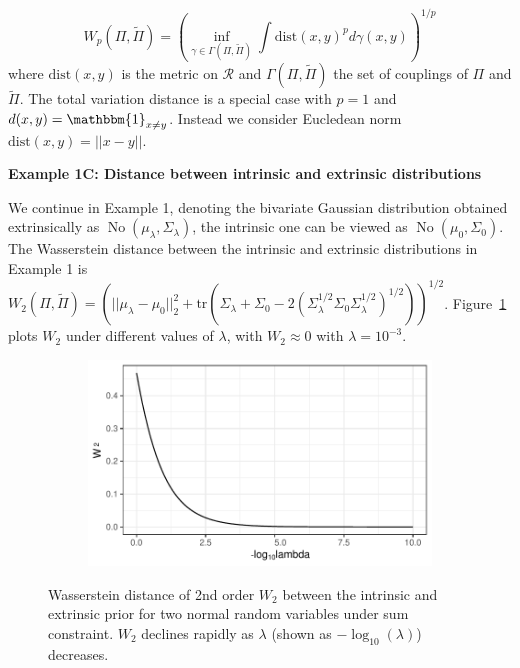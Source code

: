 \documentclass[10pt]{article}
\newcommand{\mc}[1]{\mathcal{#1}}
\DeclareMathOperator{\No}{No}
\DeclareMathOperator{\1}{\mathbbm{1}}
\begin{document}
$$W_p(\Pi,\tilde\Pi)=\left(\underset{\gamma\in \Gamma(\Pi,\tilde\Pi)}{\inf}\int \text{dist}(x,y)^p d\gamma(x,y)\right)^{1/p}$$
 where $ \text{dist}(x,y)$ is the metric on $\mc R$ and $\Gamma(\Pi,\tilde\Pi)$ the set of couplings of $\Pi$ and $\tilde\Pi$. The total variation distance is a special case with $p=1$ and $d(x,y)= \mathbbm{1}_{x \neq y}$. Instead we consider Eucledean norm $\text{dist}(x,y)=||x-y||$.


{\bf Example 1C: Distance between intrinsic and extrinsic distributions} 

We continue in Example 1, denoting the bivariate Gaussian distribution obtained extrinsically as $\No(\mu_\lambda, \Sigma_\lambda)$, the intrinsic one can be viewed as $\No(\mu_0, \Sigma_0)$. The Wasserstein distance between the intrinsic and extrinsic distributions in Example 1 \citep{dowson1982frechet} is $W_2 (\Pi,\tilde\Pi)= \left( ||\mu_\lambda - \mu_0||_2^2+ \text{tr}(\Sigma_\lambda+\Sigma_0- 2 (\Sigma_\lambda^{1/2}  \Sigma_0 \Sigma_\lambda^{1/2})^{1/2}) \right)^{1/2} $. Figure~\ref{two_normal_wass} plots $W_2$ under different values of $\lambda$, with $W_2\approx 0$ with $\lambda=10^{-3}$.



\begin{figure}[H]
\centering
   \begin{subfigure}[b]{0.45\textwidth}
    \includegraphics[width=1\textwidth]{two_normal_wass.pdf}
	\end{subfigure}
\caption{Wasserstein distance of 2nd order $W_2$ between the intrinsic and extrinsic prior for two normal random variables under sum constraint. $W_2$ declines rapidly as $\lambda$ (shown as $-\log_{10}(\lambda)$) decreases.}
\label{two_normal_wass}
\end{figure}
\end{document}
